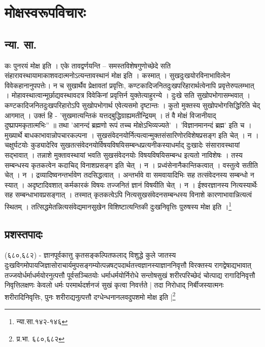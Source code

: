 \chapter{मोक्षस्वरूपविचारः}

\section{न्या. सा.}कः पुनरयं मोक्ष इति । एके तावद्वर्णयन्ति – समस्तविशेषगुणोच्छेदे सति संहारावस्थायामाकाशवदात्मनोऽत्यन्तावस्थानं मोक्ष इति । कस्मात् । सुखदुःखयोरविनाभावित्वेन विवेकहानानुपपत्तेः। न च सुखार्थैव प्रेक्षावतां प्रवृत्तिः, कण्टकादिजनितदुःखपरिहारार्थत्वेनापि प्रवृत्तेरुपलम्भात् । मोहावस्थात्वान्मूर्छाद्यवस्थावदत्र विवेकिनां प्रवृत्तिर्न युक्तेत्याहुरन्ये । दुःखे सति सुखोपभोगासम्भवात् । कण्टकादिजनितदुःखपरिहारोऽपि सुखोपभोगार्थ एवेत्यसमो दृष्टान्तः । कुतो मुक्तस्य सुखोपभोगसिद्धिरिति चेद् आगमात् । उक्तं हि -
’सुखमात्यन्तिकं यत्तद्बुद्धिग्राह्यमतीन्द्रियम् ।
तं वै मोक्षं विजानीयाद् दुष्प्रापमकृतात्मभिः” ॥
तथा
’आनन्दं ब्रह्मणो रूपं तच्च मोक्षेऽभिव्यज्यते’ । ’विज्ञानमानन्दं ब्रह्म’ इति च ।
मुख्यार्थे बाधकाभावान्नोपचारकल्पना । सुखसंवेदनयोर्नित्यत्वान्मुक्तसंसारिणोरविशेषप्रसङ्ग इति चेत् । न । चक्षुर्घटयोः कुड्यादेरिव सुखतत्संवेदनयोर्विषयविषयिसम्बन्धप्रत्यनीकस्याधर्माद् दुःखादेः संसारावस्थायां सद्भावात् । तन्नाशे मुक्तावस्थायां भवति सुखसंवेदनयोः विषयविषयिसम्बन्ध इत्यतो नाविशेषः । तस्य सम्बन्धस्य कृतकत्वेन कदाचिद् विनाशप्रसङ्ग इति चेत् । न । प्रध्वंसेनानैकान्तिकत्वात् । वस्तुत्वे सतीति चेत् । न । द्रव्यादिष्वनन्तर्भावेण तदसिद्धत्वात् । अन्तर्भावे वा समवायादिभिः सह तत्संवेदनस्य सम्बन्धो न स्यात् । अदृष्टादिवशात् कर्मकारकं विषयः तज्जनितं ज्ञानं विषयीति चेत् । न । ईश्वरज्ञानस्य नित्यस्यार्थेः सह सम्बन्धाभावप्रसङ्गात् । तस्मात् कृतकत्वेऽपि नित्यसुखसंवेदनसम्बन्धस्य विनाशे कारणाभावान्नित्यत्वं स्थितम् । तत्सिद्धमेतन्नित्यसंवेद्यमानसुखेन विशिष्टात्यन्तिकी दुःखनिवृत्तिः पुरुषस्य मोक्ष इति ।\footnote{न्या.सा.१४२-१४६}

\section{प्रशस्तपादः}(६८०,६८२) - ज्ञानपूर्वकात्तु कृतसङ्कल्पितफलाद् विशुद्धे कुले जातस्य दुःखविगमोपायजिज्ञासोराचार्यमुपसङ्गम्योत्पन्नषट्पदार्थतत्त्वज्ञानस्याज्ञाननिवृत्तौ विरक्तस्य रागद्वेषाद्यभावात् तज्जयोर्धर्माधर्मयोरनुत्पत्तौ पूर्वसञ्चितयोः धर्माधर्मयोर्निरोधे सन्तोषसुखं शरीरपरिच्छेदं चोत्पाद्य रागादिनिवृत्तौ निवृत्तिलक्षणः केवलो धर्मः परमार्थदर्शनजं सुखं कृत्वा निवर्त्तते | तदा निरोधाद् निर्बीजस्यात्मनः शरीरादिनिवृत्तिः, पुनः शरीराद्यनुत्पत्तौ दग्धेन्धनानलवदुपशमो मोक्ष इति |\footnote{प्र.भा. ६८०,६८२}

